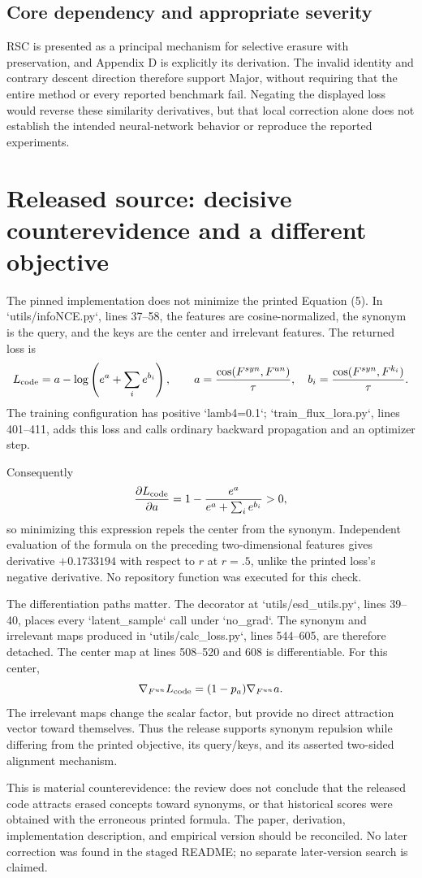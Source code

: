 \documentclass[10pt]{article}
\begin{document}
\subsection*{Core dependency and appropriate severity}
RSC is presented as a principal mechanism for selective erasure with preservation, and Appendix D is explicitly its derivation. The invalid identity and contrary descent direction therefore support Major, without requiring that the entire method or every reported benchmark fail. Negating the displayed loss would reverse these similarity derivatives, but that local correction alone does not establish the intended neural-network behavior or reproduce the reported experiments.\par
\section*{Released source: decisive counterevidence and a different objective}
The pinned implementation does not minimize the printed Equation (5). In `utils/infoNCE.py`, lines 37–58, the features are cosine-normalized, the synonym is the query, and the keys are the center and irrelevant features. The returned loss is \[L_{\rm code}
 =a-\log\left(e^a+\sum_i e^{b_i}\right),\qquad
 a=\frac{\cos(F^{syn},F^{un})}{\tau},\quad
 b_i=\frac{\cos(F^{syn},F^{k_i})}{\tau}.\] The training configuration has positive `lamb4=0.1`; `train\_flux\_lora.py`, lines 401–411, adds this loss and calls ordinary backward propagation and an optimizer step.\par
Consequently \[\frac{\partial L_{\rm code}}{\partial a}
 =1-\frac{e^a}{e^a+\sum_i e^{b_i}}>0,\] so minimizing this expression repels the center from the synonym. Independent evaluation of the formula on the preceding two-dimensional features gives derivative \(+0.1733194\) with respect to \(r\) at \(r=.5\), unlike the printed loss’s negative derivative. No repository function was executed for this check.\par
The differentiation paths matter. The decorator at `utils/esd\_utils.py`, lines 39–40, places every `latent\_sample` call under `no\_grad`. The synonym and irrelevant maps produced in `utils/calc\_loss.py`, lines 544–605, are therefore detached. The center map at lines 508–520 and 608 is differentiable. For this center, \[\nabla_{F^{un}}L_{\rm code}
 =(1-p_a)\nabla_{F^{un}}a.\] The irrelevant maps change the scalar factor, but provide no direct attraction vector toward themselves. Thus the release supports synonym repulsion while differing from the printed objective, its query/keys, and its asserted two-sided alignment mechanism.\par
This is material counterevidence: the review does not conclude that the released code attracts erased concepts toward synonyms, or that historical scores were obtained with the erroneous printed formula. The paper, derivation, implementation description, and empirical version should be reconciled. No later correction was found in the staged README; no separate later-version search is claimed.\par
\end{document}
